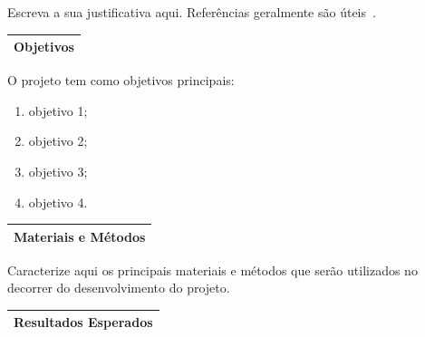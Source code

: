 \documentclass[
  12pt,				
  openright,	
  twoside,	
  a4paper,
  brazil,	
  oldfontcommands,
  ]{abntex2}
\begin{document}
Escreva a sua justificativa aqui. Referências geralmente são úteis~\cite{bukac2015analyzing,doupe2010johnny,vieira2009using}.


\begin{table}[H]
\begin{center}
\begin{tabularx}{\textwidth}{|X|}
\hline
{\bf Objetivos } \\\hline
\end{tabularx}
\end{center}
\end{table}
\vspace{-10mm}

O projeto tem como objetivos principais:
\begin{enumerate}[noitemsep]
\item objetivo 1;
\item objetivo 2;
\item objetivo 3;
\item objetivo 4.
\end{enumerate}


\begin{table}[H]
\begin{center}
\begin{tabularx}{\textwidth}{|X|}
\hline
{\bf Materiais e M\'{e}todos} \\\hline
\end{tabularx}
\end{center}
\end{table}
\vspace{-10mm}

Caracterize aqui os principais materiais e métodos que serão utilizados no decorrer do desenvolvimento do projeto.


\begin{table}[H]
\begin{center}
\begin{tabularx}{\textwidth}{|X|}
\hline
{\bf Resultados Esperados} \\\hline
\end{tabularx}
\end{center}
\end{table}
\vspace{-10mm}
\end{document}

